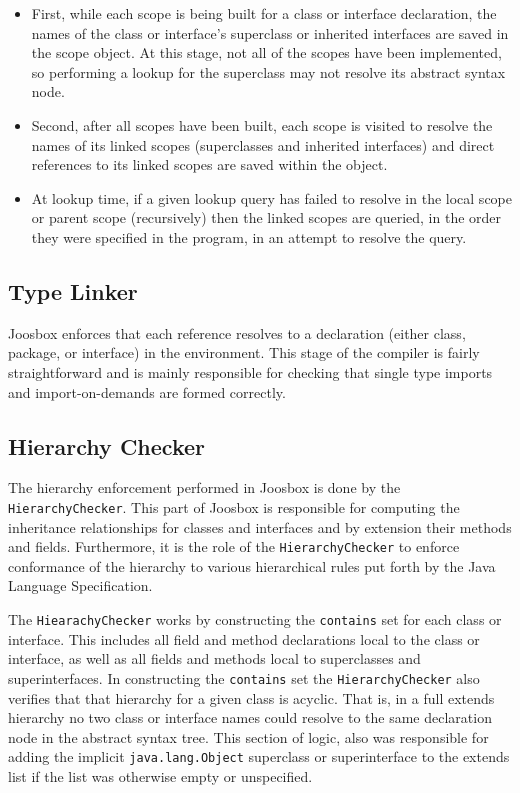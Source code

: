 \documentclass[letterpaper]{article}
\begin{document}
  \begin{itemize}
    \item First, while each scope is being built for a class or interface
    declaration, the names of the class or interface's superclass or inherited
    interfaces are saved in the scope object. At this stage, not all of the
    scopes have been implemented, so performing a lookup for the superclass
    may not resolve its abstract syntax node.

    \item Second, after all scopes have been built, each scope is visited to
    resolve the names of its linked scopes (superclasses and inherited interfaces)
    and direct references to its linked scopes are saved within the object.

    \item At lookup time, if a given lookup query has failed to resolve in
    the local scope or parent scope (recursively) then the linked scopes are
    queried, in the order they were specified in the program, in an attempt
    to resolve the query.
  \end{itemize}

  \subsection{Type Linker}

  Joosbox enforces that each reference resolves to a declaration (either class,
  package, or interface) in the environment. This stage of the compiler is
  fairly straightforward and is mainly responsible for checking that single
  type imports and import-on-demands are formed correctly.

  \subsection{Hierarchy Checker}

  The hierarchy enforcement performed in Joosbox is done by the
  {\tt HierarchyChecker}. This part of Joosbox is responsible for computing the
  inheritance relationships for classes and interfaces and by extension their
  methods and fields. Furthermore, it is the role of the {\tt HierarchyChecker}
  to enforce conformance of the hierarchy to various hierarchical rules put
  forth by the Java Language Specification.

  The {\tt HiearachyChecker} works by constructing the {\tt contains} set for
  each class or interface. This includes all field and method declarations local
  to the class or interface, as well as all fields and methods local to
  superclasses and superinterfaces. In constructing the {\tt contains} set the
  {\tt HierarchyChecker} also verifies that that hierarchy for a given class is
  acyclic. That is, in a full extends hierarchy no two class or interface names
  could resolve to the same declaration node in the abstract syntax tree. This
  section of logic, also was responsible for adding the implicit
  {\tt java.lang.Object} superclass or superinterface to the extends list if the
  list was otherwise empty or unspecified.
\end{document}
